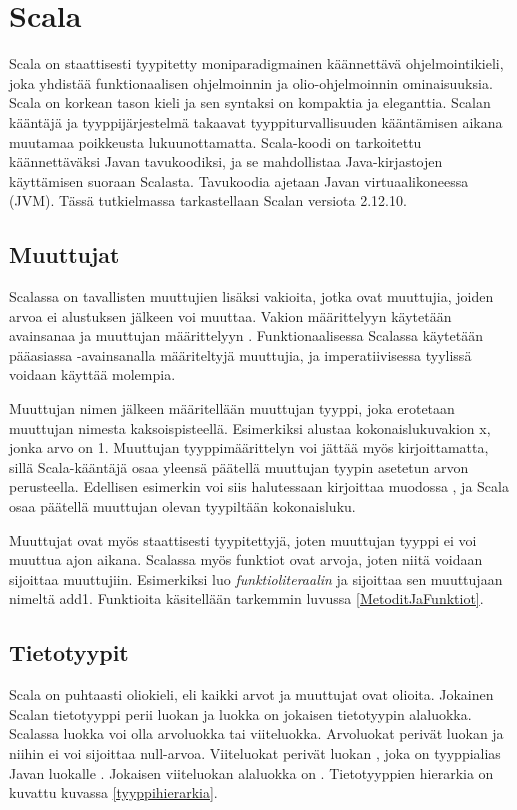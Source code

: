 \chapter{Scala} \label{Scala}
Scala on staattisesti tyypitetty moniparadigmainen käännettävä ohjelmointikieli, joka yhdistää funktionaalisen ohjelmoinnin ja olio-ohjelmoinnin ominaisuuksia. Scala on korkean tason kieli ja sen syntaksi on kompaktia ja eleganttia. Scalan kääntäjä ja tyyppijärjestelmä takaavat tyyppiturvallisuuden kääntämisen aikana muutamaa poikkeusta lukuunottamatta. Scala-koodi on tarkoitettu käännettäväksi Javan tavukoodiksi, ja se mahdollistaa Java-kirjastojen käyttämisen suoraan Scalasta. Tavukoodia ajetaan Javan virtuaalikoneessa (JVM). Tässä tutkielmassa tarkastellaan Scalan versiota 2.12.10.
\cite[Introduction]{tourOfScala}
\cite[Luku 2]{prorgrammingInScala3rd}


\section{Muuttujat} \label{Muuttujat}
Scalassa on tavallisten muuttujien lisäksi vakioita, jotka ovat muuttujia, joiden arvoa ei alustuksen jälkeen voi muuttaa. Vakion määrittelyyn käytetään avainsanaa  ja muuttujan määrittelyyn . Funktionaalisessa Scalassa käytetään pääasiassa -avainsanalla määriteltyjä muuttujia, ja imperatiivisessa tyylissä voidaan käyttää molempia.

Muuttujan nimen jälkeen määritellään muuttujan tyyppi, joka erotetaan muuttujan nimesta kaksoispisteellä. Esimerkiksi  alustaa kokonaislukuvakion x, jonka arvo on 1. Muuttujan tyyppimäärittelyn voi jättää myös kirjoittamatta, sillä Scala-kääntäjä osaa yleensä päätellä muuttujan tyypin asetetun arvon perusteella. Edellisen esimerkin voi siis halutessaan kirjoittaa muodossa , ja Scala osaa päätellä muuttujan olevan tyypiltään kokonaisluku.
\cite[Basics]{tourOfScala}

Muuttujat ovat myös staattisesti tyypitettyjä, joten muuttujan tyyppi ei voi muuttua ajon aikana. Scalassa myös funktiot ovat arvoja, joten niitä voidaan sijoittaa muuttujiin. Esimerkiksi  luo \textit{funktioliteraalin} ja sijoittaa sen muuttujaan nimeltä add1. Funktioita käsitellään tarkemmin luvussa \ref{MetoditJaFunktiot}.
\cite[Luku 1]{prorgrammingInScala3rd}


\section{Tietotyypit}
Scala on puhtaasti oliokieli, eli kaikki arvot ja muuttujat ovat olioita. Jokainen Scalan tietotyyppi perii luokan  ja luokka  on jokaisen tietotyypin alaluokka. Scalassa luokka voi olla arvoluokka tai viiteluokka. Arvoluokat perivät luokan  ja niihin ei voi sijoittaa null-arvoa. Viiteluokat perivät luokan , joka on tyyppialias Javan luokalle . Jokaisen viiteluokan alaluokka on . Tietotyyppien hierarkia on kuvattu kuvassa \ref{tyyppihierarkia}.
\cite[Luku 5]{prorgrammingInScala3rd}


